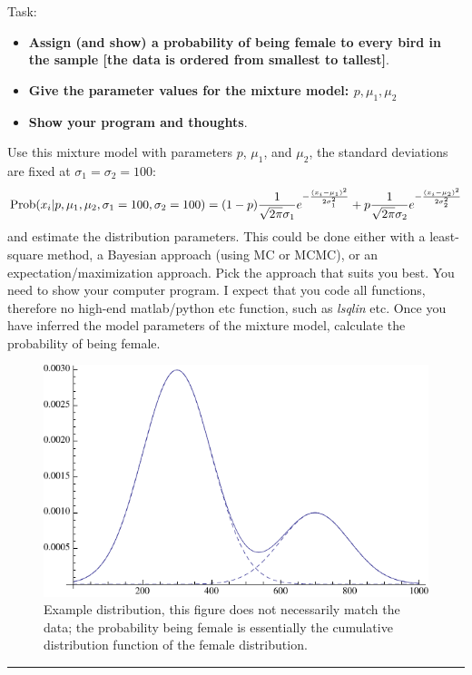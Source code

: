 \documentclass [11point]{article}
\begin{document}
Task:
\begin{itemize}
\item {\bf Assign (and show) a probability of being female to every bird in the sample [the data is ordered from smallest to tallest]}.
\item {\bf Give the parameter values for the mixture model: $p, \mu_1, \mu_2$}
\item {\bf Show your program and thoughts}.
\end{itemize}
Use this mixture model with parameters $p$, $\mu_1$, and $\mu_2$, the standard deviations are fixed at $\sigma_1=\sigma_2=100$: 
$$
{\rm Prob}(x_i | p, \mu_1,\mu_2,\sigma_1=100,\sigma_2=100) = (1-p) \frac{1}{\sqrt{2\pi} \sigma_1} e^{-\frac{(x_i-\mu_1)^2}{2 \sigma_1^2}} + p \frac{1}{\sqrt{2\pi} \sigma_2} e^{-\frac{(x_i-\mu_2)^2}{2 \sigma_2^2}}
$$
and estimate the distribution parameters. This could be done either with a least-square method, a Bayesian approach (using MC or MCMC), or an expectation/maximization approach. Pick the approach that suits you best. You need to show your computer program. I expect that you code all functions, therefore no high-end matlab/python etc function, such as  \textsl{lsqlin} etc. Once you have inferred the model parameters of the mixture model, calculate the probability of being female.

\begin{figure}[bh]
\begin{center}
\includegraphics[scale=0.75]{mixture}
\end{center}
\caption{Example distribution, this figure does not necessarily match the data; the probability being female is essentially the cumulative distribution function of the female distribution.}
\end{figure}
\bigskip
\hrule 
\end{document}
